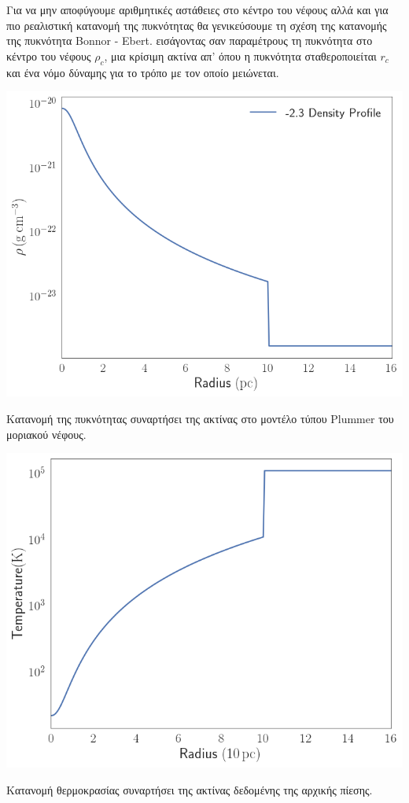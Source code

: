 Για να μην αποφύγουμε αριθμητικές αστάθειες στο κέντρο του νέφους αλλά και για πιο ρεαλιστική κατανομή της πυκνότητας θα γενικεύσουμε τη σχέση της κατανομής της πυκνότητα Bonnor - Ebert. εισάγοντας σαν παραμέτρους τη πυκνότητα στο κέντρο του νέφους $\rho _c$, μια κρίσιμη ακτίνα απ' όπου η πυκνότητα σταθεροποιείται $r_c$ και ένα νόμο δύναμης για το τρόπο με τον οποίο μειώνεται. 


\begin{marginfigure}
	\centering
	\includegraphics[width=1\linewidth]{DataImages/SimRHOProfile}
	\caption{Κατανομή της πυκνότητας συναρτήσει της ακτίνας στο μοντέλο τύπου Plummer του μοριακού νέφους. }
	\label{fig:simrhoprofile}
\end{marginfigure}

\begin{marginfigure}
	\centering
	\includegraphics[width=1\linewidth]{DataImages/SimTMPProfile}
	\caption{Κατανομή θερμοκρασίας συναρτήσει της ακτίνας δεδομένης της αρχικής πίεσης.}
	\label{fig:simtmpprofile}
\end{marginfigure}


